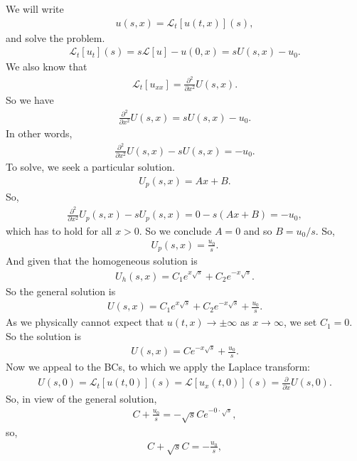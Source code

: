\documentclass{article}
\theoremstyle{definition}
\newcommand{\p}{\partial}
\newcommand{\lag}{\mathcal{L}}
\newcommand{\f}[2]{\frac{#1}{#2}}
\newcommand{\ift}{\infty}
\begin{document}
We will write
\begin{align*}
u(s,x) = \lag_t[u(t,x)](s),
\end{align*}
and solve the problem. %
\begin{align*}
\lag_t[u_t](s) = s\lag[u] - u(0,x) = sU(s,x) - u_0.
\end{align*}
We also know that 
\begin{align*}
\lag_t[u_{xx}] = \f{\p^2}{\p x^2}U(s,x).
\end{align*}
So we have
\begin{align*}
\f{\p^2}{\p x^2}U(s,x) = sU(s,x) - u_0.
\end{align*}
In other words,
\begin{align*}
\f{\p^2}{\p x^2}U(s,x) - sU(s,x) =  - u_0.
\end{align*}
To solve, we seek a particular solution. 
\begin{align*}
U_p(s,x) = Ax + B.
\end{align*}
So,
\begin{align*}
\f{\p^2}{\p x^2}U_p(s,x) - sU_p(s,x) = 0 - s(Ax+B) = -u_0,
\end{align*}
which has to hold for all $x > 0$. So we conclude $A=0$ and so $B = u_0/s$. So,
\begin{align*}
U_p(s,x) = \f{u_0}{s}.
\end{align*}
And given that the homogeneous solution is
\begin{align*}
U_h(s,x) = C_1 e^{x\sqrt{s}} + C_2e^{-x\sqrt{s}}.
\end{align*}
So the general solution is
\begin{align*}
U(s,x) = C_1 e^{x\sqrt{s}} + C_2e^{-x\sqrt{s}} + \f{u_0}{s}.
\end{align*}
As we physically cannot expect that $u(t,x) \to \pm \ift$ as $x\to \infty$, we set $C_1 = 0$. So the solution is
\begin{align*}
U(s,x) = Ce^{-x\sqrt{s}} + \f{u_0}{s}.
\end{align*}
Now we appeal to the BCs, to which we apply the Laplace transform:
\begin{align*}
U(s,0) = \lag_t[u(t,0)](s) = \lag[u_x(t,0)](s) = \f{\p}{\p x}U(s,0).
\end{align*}
So, in view of the general solution,
\begin{align*}
C + \f{u_0}{s} = -\sqrt{s}Ce^{-0\cdot\sqrt{s}},
\end{align*}
so,
\begin{align*}
C + \sqrt{s}C = -\f{u_0}{s},
\end{align*}
\end{document}

